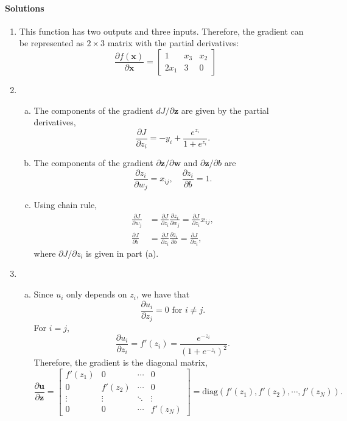 \documentclass[11pt]{article}
\def\x{\times}
\newcommand{\ubf}{\mathbf{u}}
\newcommand{\wbf}{\mathbf{w}}
\newcommand{\xbf}{\mathbf{x}}
\newcommand{\zbf}{\mathbf{z}}
\begin{document}
\paragraph*{Solutions}
\begin{enumerate}
\item This function has two outputs and three inputs.  Therefore, the gradient can be represented as 
$2 \x 3$ matrix with the partial derivatives:
\[
    \frac{\partial f(\xbf)}{\partial \xbf}
    = \left[   \begin{array}{ccc}
    1 & x_3 & x_2 \\
    2x_1 & 3 & 0
    \end{array}
    \right]
\]

\item
\begin{enumerate}[(a)]
\item The components of the gradient $dJ/\partial \zbf$ are given by the partial derivatives,
\[
    \frac{\partial J}{\partial z_i} = -y_i + \frac{e^{z_i}}{1+e^{z_i}}.
\]
\item  The components of the gradient $\partial \zbf/\partial \wbf$ and $\partial \zbf/\partial b$ are
\[
    \frac{\partial z_i}{\partial w_j} = x_{ij}, \quad \frac{\partial z_i}{\partial b} = 1.
\]

\item Using chain rule,
\begin{align*}
    \frac{\partial J}{\partial w_j} &= \frac{\partial J}{\partial z_i}\frac{\partial z_i}{\partial w_j} = 
        \frac{\partial J}{\partial z_i}x_{ij}, \\
    \frac{\partial J}{\partial b} &= \frac{\partial J}{\partial z_i}\frac{\partial z_i}{\partial b} =
        \frac{\partial J}{\partial z_i},        
\end{align*}
where $\partial J/\partial z_i$ is given in part (a).
\end{enumerate}

\item
\begin{enumerate}[(a)]
\item Since $u_i$ only depends on $z_i$, we have that
\[
    \frac{\partial u_i}{\partial z_j} = 0 \mbox{ for } i \neq j.
\]
For $i=j$,
\[
    \frac{\partial u_i}{\partial z_i} = f'(z_i) = \frac{e^{-z_i}}{(1+e^{-z_i})^2}.
\]
Therefore, the gradient is the diagonal matrix,
\[
    \frac{\partial \ubf}{\partial \zbf} = \left[
    \begin{array}{cccc}
    f'(z_1) & 0 & \cdots & 0 \\
    0 & f'(z_2) & \cdots & 0 \\
    \vdots & \vdots & \ddots & \vdots \\
    0 & 0 & \cdots & f'(z_N)
    \end{array} \right]  = \mathrm{diag}(f'(z_1),f'(z_2),\cdots,f'(z_N)).
\]


\end{enumerate}
\end{enumerate}
\end{document}
